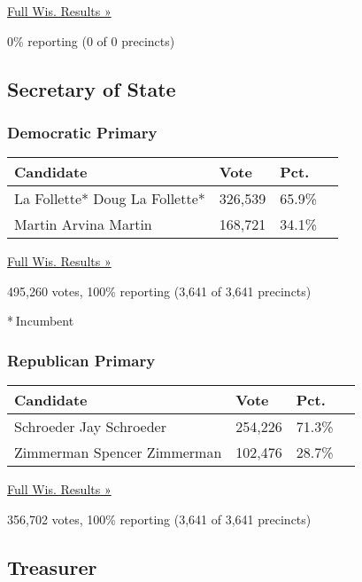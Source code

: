 \href{https://www.nytimes3xbfgragh.onion/elections/results/wisconsin}{Full
Wis. Results »}

0\% reporting (0 of 0 precincts)

\hypertarget{secretary-of-state}{%
\subsection{Secretary of State}\label{secretary-of-state}}

\hypertarget{democratic-primary-12}{%
\subsubsection{Democratic Primary}\label{democratic-primary-12}}

\begin{longtable}[]{@{}llll@{}}
\toprule
Candidate & Vote & Pct. &\tabularnewline
\midrule
\endhead
 La Follette* Doug La Follette* & 326,539 & 65.9\% &\tabularnewline
 Martin Arvina Martin & 168,721 & 34.1\% &\tabularnewline
\bottomrule
\end{longtable}

\href{https://www.nytimes3xbfgragh.onion/elections/results/wisconsin}{Full
Wis. Results »}

495,260 votes, 100\% reporting (3,641 of 3,641 precincts)

* Incumbent

\hypertarget{republican-primary-11}{%
\subsubsection{Republican Primary}\label{republican-primary-11}}

\begin{longtable}[]{@{}llll@{}}
\toprule
Candidate & Vote & Pct. &\tabularnewline
\midrule
\endhead
 Schroeder Jay Schroeder & 254,226 & 71.3\% &\tabularnewline
 Zimmerman Spencer Zimmerman & 102,476 & 28.7\% &\tabularnewline
\bottomrule
\end{longtable}

\href{https://www.nytimes3xbfgragh.onion/elections/results/wisconsin}{Full
Wis. Results »}

356,702 votes, 100\% reporting (3,641 of 3,641 precincts)

\hypertarget{treasurer}{%
\subsection{Treasurer}\label{treasurer}}

